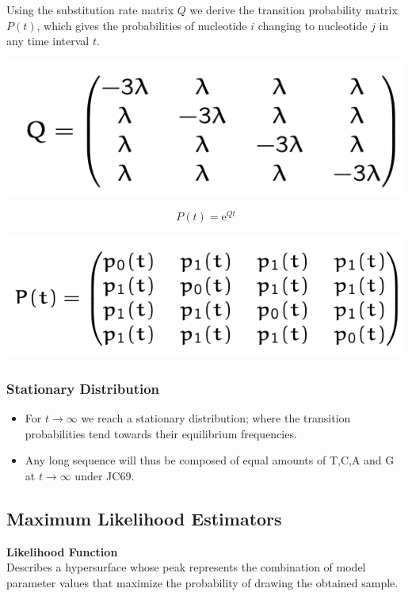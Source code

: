 \documentclass{article}
\begin{document}
\begin{multicols*}{3}
Using the substitution rate matrix $Q$ we derive the transition probability matrix $P(t)$, which gives the probabilities of nucleotide $i$ changing to nucleotide $j$ in any time interval $t$.

\begin{center}
    \includegraphics[width=0.5\linewidth]{substitutionratematrix.png}
\end{center}

$$P(t) = \text{e}^{Qt}$$

\begin{center}
    \includegraphics[width=0.7\linewidth]{transitionprobabilitymatrix.png}
\end{center}

\subsubsection{Stationary Distribution}

\begin{itemize}
    \item For $t \rightarrow \infty$ we reach a stationary distribution; where the transition probabilities tend towards their equilibrium frequencies.%
    \item Any long sequence will thus be composed of equal amounts of T,C,A and G at $t \rightarrow \infty$ under JC69. %
\end{itemize}

\subsection{Maximum Likelihood Estimators}
\begin{mdframed}[backgroundcolor=astral] 
    \textbf{Likelihood Function}\\
    Describes a hypersurface whose peak represents the combination of model parameter values that maximize the probability of drawing the obtained sample. 
\end{mdframed}


\end{multicols*}
\end{document}
